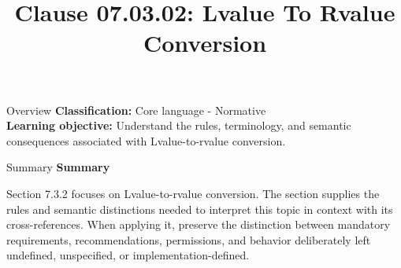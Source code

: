 \documentclass[10pt,letterpaper]{article}
\title{Clause 07.03.02: Lvalue To Rvalue Conversion}
\author{}
\date{}
\begin{document}
\maketitle
\begin{CornellOverviewBox}{Overview}
\textbf{Classification:} Core language - Normative\\[2pt]
\textbf{Learning objective:} Understand the rules, terminology, and semantic consequences associated with Lvalue-to-rvalue conversion.
\end{CornellOverviewBox}\begin{CornellSummaryBox}{Summary}
{\sffamily\bfseries\color{Accent} Summary}\par\vspace{3pt}Section 7.3.2 focuses on Lvalue-to-rvalue conversion. The section supplies the rules and semantic distinctions needed to interpret this topic in context with its cross-references. When applying it, preserve the distinction between mandatory requirements, recommendations, permissions, and behavior deliberately left undefined, unspecified, or implementation-defined.
\end{CornellSummaryBox}
\end{document}
